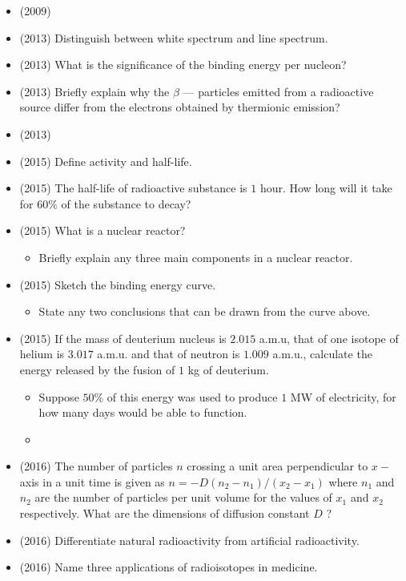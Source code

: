 \documentclass{article}
\begin{document}
\begin{itemize}
\begin{itemize}
\end{itemize}
\item (2009)  \item (2013)  Distinguish between white spectrum and line spectrum. 
\item (2013)  What is the significance of the binding energy per nucleon? 
\item (2013)  Briefly explain why the $ \beta$  — particles emitted from a radioactive source differ from the electrons obtained by thermionic emission? 
\item (2013)  \item (2015)  Define activity and half-life.
\item (2015)  The half-life of radioactive substance is $ 1$ hour.  How long will it take for $ 60\%$ of the substance to decay?
\item (2015)  What is a nuclear reactor?\begin{itemize}
\item Briefly explain any three main components in a nuclear reactor.
\end{itemize}
\item (2015)  Sketch the binding energy curve.\begin{itemize}
\item State any two conclusions that can be drawn from the curve above.
\end{itemize}
\item (2015)  If the mass of deuterium nucleus is $ 2.015$ a.m.u, that of one isotope of helium is $ 3.017$ a.m.u. and that of neutron is $ 1.009$ a.m.u., calculate the energy released by the fusion of $ 1$ kg of deuterium. \begin{itemize}
\item Suppose $ 50\%$ of this energy was used to produce $ 1$ MW of electricity, for how many days would be able to function.
\item 
\end{itemize}
\item (2016)  The number of particles $ n$ crossing a unit area perpendicular to $ x-$ axis in a unit time is given as $ n=-D(n_{2}-n_{1})/(x_{2}-x_{1})$ where $ n_{1}$ and $ n_{2}$ are the number of particles per unit volume for the values of $ x_{1}$ and $ x_{2}$ respectively.  What are the dimensions of diffusion constant $ D$ ?
\item (2016)  Differentiate natural radioactivity from artificial radioactivity.
\item (2016)  Name three applications of radioisotopes in medicine.

\end{itemize}
\end{document}
